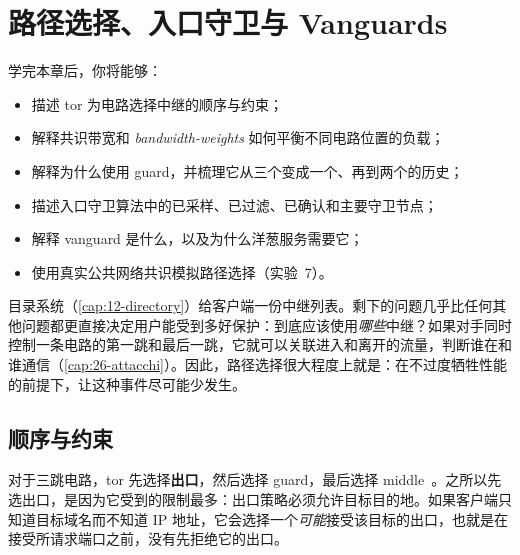 \chapter{路径选择、入口守卫与 Vanguards}\label{cap:13-percorso}

\begin{obiettivi}
学完本章后，你将能够：
\begin{itemize}[nosep]
  \item 描述 tor 为电路选择中继的顺序与约束；
  \item 解释共识带宽和 \emph{bandwidth-weights} 如何平衡不同电路位置的负载；
  \item 解释为什么使用 guard，并梳理它从三个变成一个、再到两个的历史；
  \item 描述入口守卫算法中的已采样、已过滤、已确认和主要守卫节点；
  \item 解释 vanguard 是什么，以及为什么洋葱服务需要它；
  \item 使用真实公共网络共识模拟路径选择（实验~7）。
\end{itemize}
\end{obiettivi}

目录系统（\cref{cap:12-directory}）给客户端一份中继列表。剩下的问题几乎比任何其他问题都更直接决定用户能受到多好保护：到底应该使用\emph{哪些}中继？如果对手同时控制一条电路的第一跳和最后一跳，它就可以关联进入和离开的流量，判断谁在和谁通信（\cref{cap:26-attacchi}）。因此，路径选择很大程度上就是：在不过度牺牲性能的前提下，让这种事件尽可能少发生。

\section{顺序与约束}\label{sec:percorso-vincoli}

对于三跳电路，tor 先选择\textbf{出口}，然后选择 guard，最后选择 middle~。之所以先选出口，是因为它受到的限制最多：出口策略必须允许目标目的地。如果客户端只知道目标域名而不知道 IP 地址，它会选择一个\emph{可能}接受该目标的出口，也就是在接受所请求端口之前，没有先拒绝它的出口。

